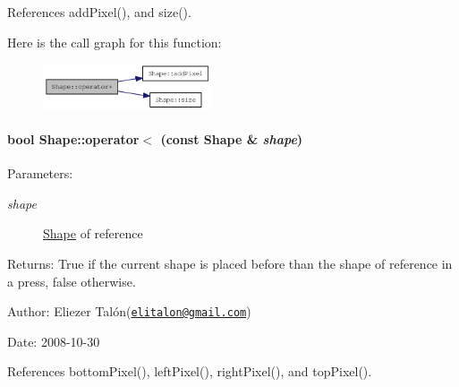 References addPixel(), and size().

Here is the call graph for this function:\nopagebreak
\begin{figure}[H]
\begin{center}
\leavevmode
\includegraphics[width=141pt]{class_shape_4e1517d6e14471df4750bc241f517b4e_cgraph}
\end{center}
\end{figure}
\hypertarget{class_shape_183a6bc428172ced8122ffb68d0f04ef}{
\paragraph[operator$<$]{\setlength{\rightskip}{0pt plus 5cm}bool Shape::operator$<$ (const {\bf Shape} \& {\em shape})}\hfill}
\label{class_shape_183a6bc428172ced8122ffb68d0f04ef}


\begin{Desc}
\item[Parameters:]
\begin{description}
\item[{\em shape}]\hyperlink{class_shape}{Shape} of reference\end{description}
\end{Desc}
\begin{Desc}
\item[Returns:]True if the current shape is placed before than the shape of reference in a press, false otherwise.\end{Desc}
\begin{Desc}
\item[Author:]Eliezer Talón(\href{mailto:elitalon@gmail.com}{\tt elitalon@gmail.com}) \end{Desc}
\begin{Desc}
\item[Date:]2008-10-30 \end{Desc}


References bottomPixel(), leftPixel(), rightPixel(), and topPixel().

